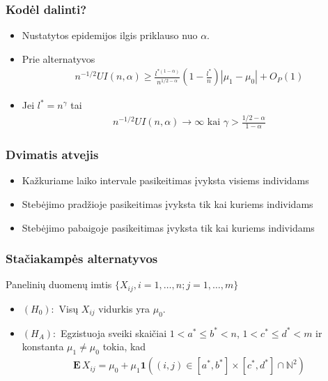 \documentclass[utf8,hyperref={unicode}]{beamer}
\theoremstyle{change}\newtheorem{teorema}{Teiginys}
\theoremstyle{change}\newtheorem{salyga}{}
\newcommand{\E}{\mathbf{E}\,} %
\newcommand{\HH}{\mathrm{H}} %
\newcommand{\Hao}{\HH_{\alpha}^o}
\newcommand{\indf}[1]{\mathbf{1}\left( #1 \right)}
\begin{document}
\begin{frame}
    \frametitle{Kodėl dalinti?}
    \begin{itemize}
	\item Nustatytos epidemijos ilgis priklauso nuo $\alpha$.	
	\item Prie alternatyvos   
	    \begin{align*}
		n^{-1/2}UI(n,\alpha)\ge 
		\frac{l^{*(1-\alpha)}}{n^{1/2-\alpha}}\left(1-\frac{l^*}{n}\right)|\mu_1-\mu_0|+O_P(1)
	    \end{align*}
	\item Jei $l^*=n^\gamma$ tai 
	    \begin{align*}
		n^{-1/2}UI(n,\alpha)\to \infty \text{ kai }
		\gamma>\frac{1/2-\alpha}{1-\alpha}
	    \end{align*}
    \end{itemize}
\end{frame}

\begin{frame}
    \frametitle{Dvimatis atvejis} 
    
    \begin{itemize}
	\item Kažkuriame laiko intervale pasikeitimas įvyksta visiems individams
	\item Stebėjimo pradžioje pasikeitimas įvyksta tik kai kuriems
	    individams
	\item Stebėjimo pabaigoje pasikeitimas įvyksta tik kai kuriems
	    individams
    \end{itemize}

\end{frame}
\begin{frame}
    \frametitle{Stačiakampės alternatyvos} 
    Panelinių duomenų imtis $\{X_{ij}, i=1,\dots,n;j=1,\dots,m\}$
    \begin{itemize}
	\item  $(H_0):$ Visų {$X_{ij}$ vidurkis yra $\mu_{0}$.}
	\item  $(H_A):$ {Egzistuoja sveiki skaičiai $1<a^*\le b^*<n$, 
$1<c^*\le d^*<m$} ir konstanta $\mu_1\neq \mu_0$ tokia, kad
\begin{align*}
    \E X_{ij}=\mu_0+\mu_1\indf{(i,j)\in[a^*,b^*]\times[c^*,d^*]\cap \mathbb{N}^2}
\end{align*}
\end{itemize}
\end{frame}
\end{document}
